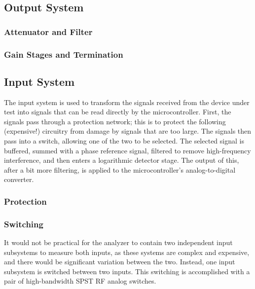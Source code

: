 \subsection{Output System}

\subsubsection{Attenuator and Filter}
\subsubsection{Gain Stages and Termination}

\subsection{Input System}

The input system is used to transform the signals received from the device
under test into signals that can be read directly by the microcontroller.
First, the signals pass through a protection network; this is to protect
the following (expensive!) circuitry from damage by signals that are too
large. The signals then pass into a switch, allowing one of the two to be
selected. The selected signal is buffered, summed with a phase reference signal,
filtered to remove high-frequency interference, and then enters a logarithmic
detector stage. The output of this, after a bit more filtering, is applied to
the microcontroller's analog-to-digital converter.

\subsubsection{Protection}

\subsubsection{Switching}


It would not be practical for the analyzer to contain two independent input
subsystems to measure both inputs, as these systems are complex and expensive,
and there would be significant variation between the two. Instead, one input
subsystem is switched between two inputs. This switching is accomplished with a
pair of high-bandwidth SPST RF analog switches.

